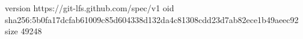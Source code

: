 version https://git-lfs.github.com/spec/v1
oid sha256:5b0fa17dcfab61009c85d604338d132da4c81308cdd23d7ab82ece1b49aeec92
size 49248
